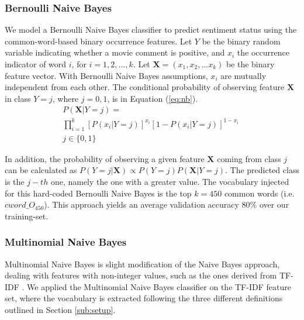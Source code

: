 \documentclass[twoside,twocolumn]{article}
\begin{document}
\subsubsection{Bernoulli Naive Bayes}
We model a Bernoulli Naive Bayes classifier to predict sentiment status using the common-word-based binary occurrence features. Let $Y$ be the binary random variable indicating whether a movie comment is positive, and $x_i$ the occurrence indicator of word $i$, for $i = 1, 2, \ldots, k$. Let $\boldsymbol{X} = \left(x_1, x_2, \ldots x_k \right)$ be the binary feature vector. With Bernoulli Naive Bayes assumptions, $x_i$ are mutually independent from each other. The conditional probability of observing feature $\boldsymbol{X}$ in class $Y=j$, where $j = 0, 1$, is in Equation (\ref{eq:nb}).
\begin{equation}
\begin{split}
P(\boldsymbol{X}|Y=j)=\\ \prod_{i=1}^{k} \left[P(x_{i}|Y=j)\right]^{x_i}\left[1-P(x_{i}|Y=j)\right]^{1-x_i} \;  \\
j \in \{0, 1\} 
\label{eq:nb}
\end{split}
\end{equation}

In addition, the probability of observing a given feature $\boldsymbol{X}$ coming from class $j$ can be calculated as $P(Y=j|\boldsymbol{X}) \propto P(Y=j) P(\boldsymbol{X}|Y=j) $. The predicted class is the $j-th$ one, namely the one with a greater value. The vocabulary injected for this hard-coded Bernoulli Naive Bayes is the top $k=450$ common words (i.e. $cword\_O_{450}$). This approach yields an average validation accuracy  $80\%$ over our training-set.

\subsubsection{Multinomial Naive Bayes}
Multinomial Naive Bayes is slight modification of the Naive Bayes approach, dealing with features with non-integer values, such as the ones derived from TF-IDF \citep{kibriya2004multinomial}.
We applied the Multinomial Naive Bayes classifier on the TF-IDF feature set, where the vocabulary is extracted following the three different definitions outlined in Section \ref{sub:setup}.
\end{document}
